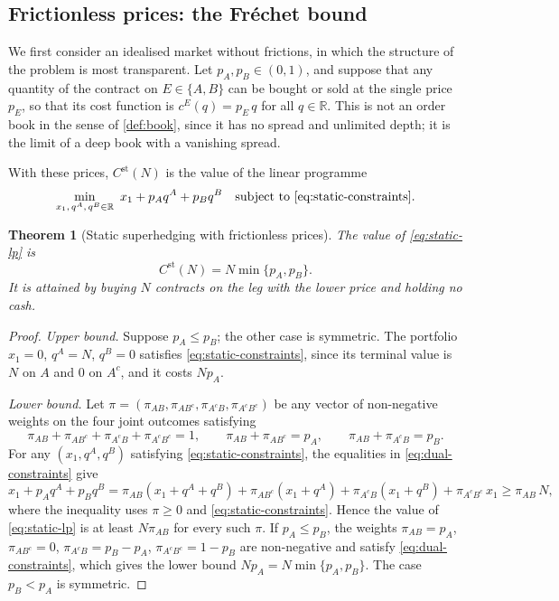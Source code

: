 \documentclass[11pt,a4paper]{article}
\theoremstyle{plain}
\newtheorem{theorem}{Theorem}[section]
\theoremstyle{definition}
\theoremstyle{remark}
\newcommand{\1}{\mathbf{1}}
\newcommand{\R}{\mathbb{R}}
\begin{document}
\subsection{Frictionless prices: the Fréchet bound}

We first consider an idealised market without frictions, in which the structure of the problem is most transparent. Let $p_A,p_B\in(0,1)$, and suppose that any quantity of the contract on $E\in\{A,B\}$ can be bought or sold at the single price $p_E$, so that its cost function is $c^E(q) = p_E\,q$ for all $q\in\R$. This is not an order book in the sense of \cref{def:book}, since it has no spread and unlimited depth; it is the limit of a deep book with a vanishing spread.

With these prices, $C^{\mathrm{st}}(N)$ is the value of the linear programme
\begin{equation}
\label{eq:static-lp}
\min_{x_1,\,q^A,\,q^B\in\R}\ x_1 + p_A q^A + p_B q^B \quad\text{subject to \eqref{eq:static-constraints}}.
\end{equation}

\begin{theorem}[Static superhedging with frictionless prices]
\label{thm:frechet}
The value of \eqref{eq:static-lp} is
\[
C^{\mathrm{st}}(N) = N\min\{p_A,p_B\}.
\]
It is attained by buying $N$ contracts on the leg with the lower price and holding no cash.
\end{theorem}

\begin{proof}
\emph{Upper bound.} Suppose $p_A\leq p_B$; the other case is symmetric. The portfolio $x_1=0$, $q^A=N$, $q^B=0$ satisfies \eqref{eq:static-constraints}, since its terminal value is $N$ on $A$ and $0$ on $A^c$, and it costs $N p_A$.

\emph{Lower bound.} Let $\pi = (\pi_{AB},\pi_{AB^c},\pi_{A^cB},\pi_{A^cB^c})$ be any vector of non-negative weights on the four joint outcomes satisfying
\begin{equation}
\label{eq:dual-constraints}
\pi_{AB}+\pi_{AB^c}+\pi_{A^cB}+\pi_{A^cB^c} = 1,\qquad \pi_{AB}+\pi_{AB^c} = p_A,\qquad \pi_{AB}+\pi_{A^cB} = p_B.
\end{equation}
For any $(x_1,q^A,q^B)$ satisfying \eqref{eq:static-constraints}, the equalities in \eqref{eq:dual-constraints} give
\[
x_1 + p_Aq^A + p_Bq^B = \pi_{AB}(x_1+q^A+q^B) + \pi_{AB^c}(x_1+q^A) + \pi_{A^cB}(x_1+q^B) + \pi_{A^cB^c}\,x_1 \geq \pi_{AB}\,N,
\]
where the inequality uses $\pi\geq 0$ and \eqref{eq:static-constraints}. Hence the value of \eqref{eq:static-lp} is at least $N\pi_{AB}$ for every such $\pi$. If $p_A\leq p_B$, the weights $\pi_{AB}=p_A$, $\pi_{AB^c}=0$, $\pi_{A^cB}=p_B-p_A$, $\pi_{A^cB^c}=1-p_B$ are non-negative and satisfy \eqref{eq:dual-constraints}, which gives the lower bound $Np_A = N\min\{p_A,p_B\}$. The case $p_B<p_A$ is symmetric.
\end{proof}
\end{document}
